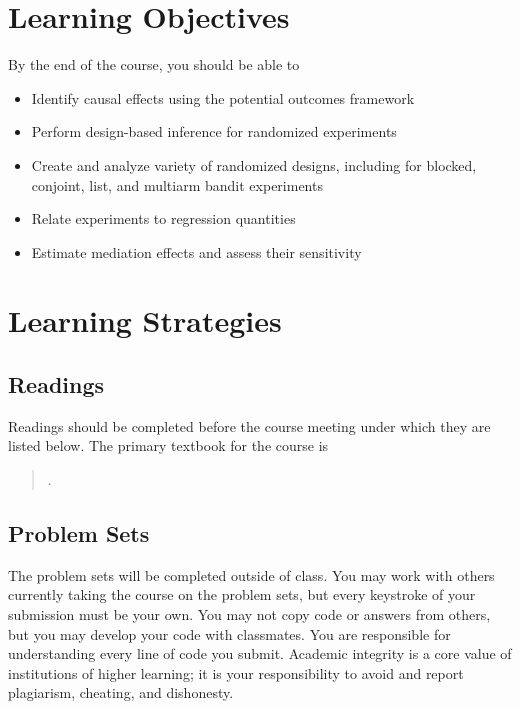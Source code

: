 \documentclass[11pt]{article}
\newcommand{\bibverse}[1]{\begin{verse} \bibentry{#1}. \end{verse}}
\begin{document}
\section*{Learning Objectives}

By the end of the course, you should be able to

\begin{itemize}
\item Identify causal effects using the potential outcomes framework
\item Perform design-based inference for randomized experiments
\item Create and analyze variety of randomized designs, including for blocked, conjoint, list, and multiarm bandit experiments
\item Relate experiments to regression quantities
\item Estimate mediation effects and assess their sensitivity
\end{itemize}

\section*{Learning Strategies}

\subsection*{Readings}

Readings should be completed before the course meeting under which they are listed below.  The primary textbook for the course is

\nobibliography*

\bibverse{gergre12}


\subsection*{Problem Sets}
The problem sets will be completed outside of class.  You may work with others currently taking the course on the problem sets, but every keystroke of your submission must be your own.  You may not copy code or answers from others, but you may develop your code with classmates.  You are responsible for understanding every line of code you submit.  Academic integrity is a core value of institutions of higher learning; it is your responsibility to avoid and report plagiarism, cheating, and
dishonesty.
\end{document}
